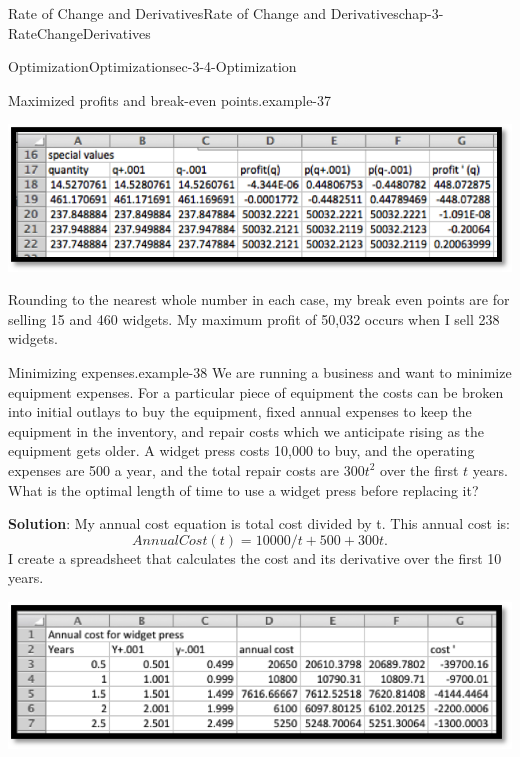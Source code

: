 \documentclass[oneside,10pt,]{book}
\newcommand{\terminology}[1]{\textbf{#1}}
\numberwithin{equation}{section}
\begin{document}
\begin{chapterptx}{Rate of Change and Derivatives}{}{Rate of Change and Derivatives}{}{}{chap-3-RateChangeDerivatives}
\begin{sectionptx}{Optimization}{}{Optimization}{}{}{sec-3-4-Optimization}
\begin{example}{Maximized profits and break-even points.}{example-37}
\begin{sidebyside}{1}{0.15}{0.15}{0}%
\begin{sbspanel}{0.7}%
\includegraphics[width=1\linewidth]{images/sec3-4-10.png}
\end{sbspanel}%
\end{sidebyside}%
\par
\hypertarget{p-1234}{}%
Rounding to the nearest whole number in each case, my break even points are for selling 15 and 460 widgets.  My maximum profit of \textdollar{}50,032 occurs when I sell 238 widgets.%
\end{example}
\begin{example}{Minimizing expenses.}{example-38}%
\hypertarget{p-1235}{}%
We are running a business and want to minimize equipment expenses.  For a particular piece of equipment the costs can be broken into initial outlays to buy the equipment, fixed annual expenses to keep the equipment in the inventory, and repair costs which we anticipate rising as the equipment gets older.  A widget press costs \textdollar{}10,000 to buy, and the operating expenses are \textdollar{}500 a year, and the total repair costs are \(300t^2\) over the first \(t\) years.  What is the optimal length of time to use a widget press before replacing it?%
\par
\hypertarget{p-1236}{}%
\terminology{Solution}:  My annual cost equation is total cost divided by t.  This annual cost is:%
%
\begin{equation*}
AnnualCost(t)=10000/t+500+300t.
\end{equation*}
\hypertarget{p-1237}{}%
I create a spreadsheet that calculates the cost and its derivative over the first 10 years.%
\begin{sidebyside}{1}{0.15}{0.15}{0}%
\begin{sbspanel}{0.7}%
\includegraphics[width=1\linewidth]{images/sec3-4-11.png}

\end{sbspanel}
\end{sidebyside}
\end{example}
\end{sectionptx}
\end{chapterptx}
\end{document}
